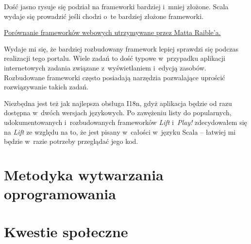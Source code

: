 \documentclass[a4paper]{article}
\begin{document}
Dość jasno rysuje się podział na frameworki bardziej i~mniej złożone.
Scala wydaje się prowadzić jeśli chodzi o~te bardziej złożone frameworki.

\href{https://spreadsheets.google.com/a/bubr.pl/pub?key=0AtkkDCT2WDMXdC1HOEtnUHpCejJMbUhGeGJWUmh5dVE&hl=en&output=html}{Porównanie frameworków webowych utrzymywane przez Matta Raible'a.}

Wydaje mi się, że bardziej rozbudowany framework lepiej sprawdzi się podczas realizacji tego portalu.
Wiele zadań to dość typowe w~przypadku aplikacji internetowych zadania związane z~wyświetlaniem i~edycją zasobów.
Rozbudowane frameworki często posiadają narzędzia pozwalające uprościć rozwiązywanie takich zadań.

Niezbędna jest też jak najlepsza obsługa I18n, gdyż aplikacja będzie od razu dostępna w~dwóch wersjach językowych.
Po zawężeniu listy do popularnych, udokumentowanych i~rozbudowanych frameworków \emph{Lift} i~\emph{Play!} zdecydowałem się na \emph{Lift} ze względu na to, że jest pisany w~całości w~języku Scala -- łatwiej mi będzie w~razie potrzeby przeglądać jego kod.

\section{Metodyka wytwarzania oprogramowania}
\section{Kwestie społeczne}
\end{document}
